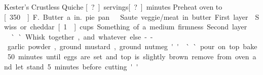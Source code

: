 \begin{recipe}{Kester's Crustless Quiche}
{\unit[?]{servings}}{\unit[?]{minutes}}
\freeform Preheat oven to \unit[350\0]{F.} Butter a \unit[9]{in.} pie pan.
Saute veggie/meat in butter. First layer.
Swiss or cheddar. \unit[1]{cups}. Something of a medium firmness. Second layer.

``Whisk together, ... and whatever else--garlic powder, ground mustard,
ground nutmeg...''

\freeform ``... pour on top.  bake 50 minutes until eggs are set and top is
slightly brown.  remove from oven and let stand 5 minutes before
cutting.''
\end{recipe}
